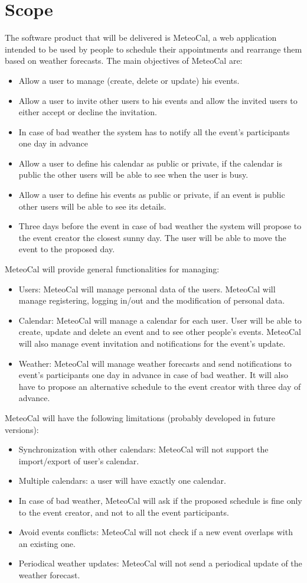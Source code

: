 \documentclass[10pt,a4paper,titlepage]{article}
\begin{document}
\section{Scope}
The software product that will be delivered is MeteoCal, a web application intended to be used by people to schedule their appointments and rearrange them based on weather forecasts.
The main objectives of MeteoCal are:
\begin{itemize}
\item Allow a user to manage (create, delete or update) his events.
\item Allow a user to invite other users to his events and allow the invited users to either accept or decline the invitation.
\item In case of bad weather the system has to notify all the event's participants one day in advance
\item Allow a user to define his calendar as public or private, if the calendar is public the other users will be able to see when the user is busy.
\item Allow a user to define his events as public or private, if an event is public other users will be able to see its details.
\item Three days before the event in case of bad weather the system will propose to the event creator the closest sunny day. The user will be able to move the event to the proposed day.
\end{itemize}
MeteoCal will provide general functionalities for managing:
\begin{itemize}
\item Users: MeteoCal will manage personal data of the users. MeteoCal will manage registering, logging in/out and the modification of personal data.
\item Calendar: MeteoCal will manage a calendar for each user. User will be able to create, update and delete an event and to see other people's events. MeteoCal will also manage event invitation and notifications for the event's update.
\item Weather: MeteoCal will manage weather forecasts and send notifications to event's participants one day in advance in case of bad weather. It will also have to propose an alternative schedule to the event creator with three day of advance.
\end{itemize}
MeteoCal will have the following limitations (probably developed in future versions):
\begin{itemize}
\item Synchronization with other calendars: MeteoCal will not support the import/export of user's calendar.
\item Multiple calendars: a user will have exactly one calendar.
\item In case of bad weather, MeteoCal will ask if the proposed schedule is fine only to the event creator, and not to all the event participants.
\item Avoid events conflicts: MeteoCal will not check if a new event overlaps with an existing one.
\item Periodical weather updates: MeteoCal will not send a periodical update of the weather forecast.
\end{itemize}
\end{document}
